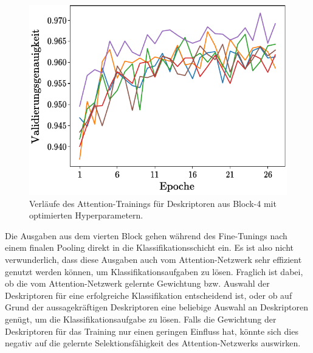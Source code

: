 \begin{figure}[h]
\centering
\includegraphics[scale=1]{NNOPT/6_model_verlauf_layer4}
\caption{Verläufe des Attention-Trainings für Deskriptoren aus Block-4 mit optimierten Hyperparametern.}
\label{optimized_runs_layer4}
\end{figure}
Die Ausgaben aus dem vierten Block gehen während des Fine-Tunings nach einem finalen Pooling direkt in die Klassifikationsschicht ein. Es ist also nicht verwunderlich, dass diese Ausgaben auch vom Attention-Netzwerk sehr effizient genutzt werden können, um Klassifikationsaufgaben zu lösen. Fraglich ist dabei, ob die vom Attention-Netzwerk gelernte Gewichtung bzw. Auswahl der Deskriptoren für eine erfolgreiche Klassifikation entscheidend ist, oder ob auf Grund der aussagekräftigen Deskriptoren eine beliebige Auswahl an Deskriptoren genügt, um die Klassifikationsaufgabe zu lösen. Falls die Gewichtung der Deskriptoren für das Training nur einen geringen Einfluss hat, könnte sich dies negativ auf die gelernte Selektionsfähigkeit des Attention-Netzwerks auswirken.
\\


